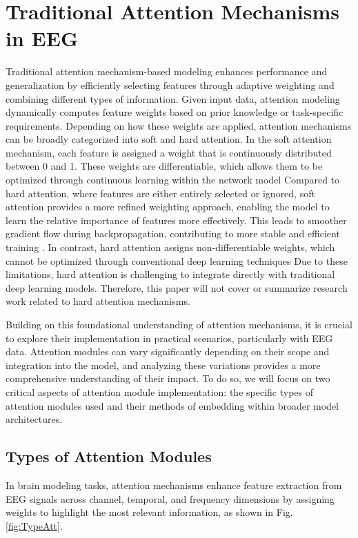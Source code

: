 \documentclass[preprint,12pt]{elsarticle}
\begin{document}
\section{Traditional Attention Mechanisms in EEG}
Traditional attention mechanism-based modeling enhances performance and generalization by efficiently selecting features through adaptive weighting and combining different types of information. Given input data, attention modeling dynamically computes feature weights based on prior knowledge or task-specific requirements.  Depending on how these weights are applied, attention mechanisms can be broadly categorized into soft and hard attention. In the soft attention mechanism, each feature is assigned a weight that is continuously distributed between 0 and 1. These weights are differentiable, which allows them to be optimized through continuous learning within the network model \cite{shen2018reinforced} Compared to hard attention, where features are either entirely selected or ignored, soft attention provides a more refined weighting approach, enabling the model to learn the relative importance of features more effectively. This leads to smoother gradient flow during backpropagation, contributing to more stable and efficient training \cite{lu2023multi}. In contrast, hard attention assigns non-differentiable weights, which cannot be optimized through conventional deep learning techniques \cite{chen2021deep} Due to these limitations, hard attention is challenging to integrate directly with traditional deep learning models. Therefore, this paper will not cover or summarize research work related to hard attention mechanisms.

Building on this foundational understanding of attention mechanisms, it is crucial to explore their implementation in practical scenarios, particularly with EEG data. Attention modules can vary significantly depending on their scope and integration into the model, and analyzing these variations provides a more comprehensive understanding of their impact. To do so, we will focus on two critical aspects of attention module implementation: the specific types of attention modules used and their methods of embedding within broader model architectures.




\subsection{Types of Attention Modules}
In brain modeling tasks, attention mechanisms enhance feature extraction from EEG signals across channel, temporal, and frequency dimensions by assigning weights to highlight the most relevant information, as shown in Fig. \ref{fig:TypeAtt}.
\end{document}
